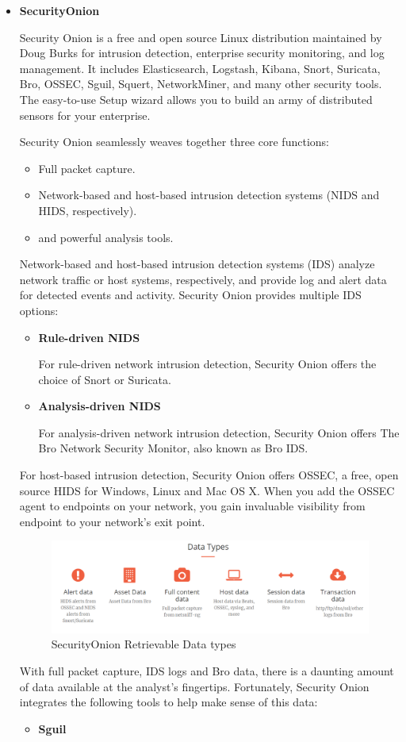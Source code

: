 \begin{itemize}[label=]
\item\textbf{SecurityOnion}

Security Onion is a free and open source Linux distribution maintained by Doug Burks  for intrusion detection, enterprise security monitoring, and log management. It includes Elasticsearch, Logstash, Kibana, Snort, Suricata, Bro, OSSEC, Sguil, Squert, NetworkMiner, and many other security tools. The easy-to-use Setup wizard allows you to build an army of distributed sensors for your enterprise. 

Security Onion seamlessly weaves together three core functions:
    \begin{itemize}
        \item Full packet capture.
        \item Network-based and host-based intrusion detection systems (NIDS and HIDS, respectively).
        \item and powerful analysis tools.
    \end{itemize}

Network-based and host-based intrusion detection systems (IDS) analyze network traffic or host systems, respectively, and provide log and alert data for detected events and activity. Security Onion provides multiple IDS options:
    \begin{itemize}
        \item\textbf{Rule-driven NIDS}
        
        For rule-driven network intrusion detection, Security Onion offers the choice of Snort or Suricata.
        \item\textbf{Analysis-driven NIDS}
        
        For analysis-driven network intrusion detection, Security Onion offers The Bro Network Security Monitor, also known as Bro IDS.
    \end{itemize}
For host-based intrusion detection, Security Onion offers OSSEC, a free, open source HIDS for Windows, Linux and Mac OS X. When you add the OSSEC agent to endpoints on your network, you gain invaluable visibility from endpoint to your network’s exit point. 
\begin{figure}[!htpb] 
\begin{center}
\includegraphics[width=18 cm]{images/ATHENAsoso.png}
\end{center}
\caption{ SecurityOnion Retrievable Data types }
\label{so}
\end{figure}
With full packet capture, IDS logs and Bro data, there is a daunting amount of data available at the analyst’s fingertips. Fortunately, Security Onion integrates the following tools to help make sense of this data:
    \begin{itemize}
        \item\textbf{Sguil} 
        

\end{itemize}
\end{itemize}
